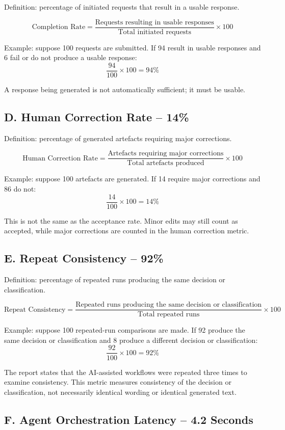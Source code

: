 \documentclass[11pt,a4paper]{article}
\begin{document}
Definition: percentage of initiated requests that result in a usable response.

\[
\text{Completion Rate} =
\frac{\text{Requests resulting in usable responses}}
     {\text{Total initiated requests}}\times 100
\]

Example: suppose 100 requests are submitted. If 94 result in usable responses and 6 fail or do not produce a usable response:
\[
\frac{94}{100}\times 100=94\%
\]

A response being generated is not automatically sufficient; it must be usable.

\subsection{D. Human Correction Rate -- 14\%}

Definition: percentage of generated artefacts requiring major corrections.

\[
\text{Human Correction Rate} =
\frac{\text{Artefacts requiring major corrections}}
     {\text{Total artefacts produced}}\times 100
\]

Example: suppose 100 artefacts are generated. If 14 require major corrections and 86 do not:
\[
\frac{14}{100}\times 100=14\%
\]

This is not the same as the acceptance rate. Minor edits may still count as accepted, while major corrections are counted in the human correction metric.

\subsection{E. Repeat Consistency -- 92\%}

Definition: percentage of repeated runs producing the same decision or classification.

\[
\text{Repeat Consistency} =
\frac{\text{Repeated runs producing the same decision or classification}}
     {\text{Total repeated runs}}\times 100
\]

Example: suppose 100 repeated-run comparisons are made. If 92 produce the same decision or classification and 8 produce a different decision or classification:
\[
\frac{92}{100}\times 100=92\%
\]

The report states that the AI-assisted workflows were repeated three times to examine consistency. This metric measures consistency of the decision or classification, not necessarily identical wording or identical generated text.

\subsection{F. Agent Orchestration Latency -- 4.2 Seconds}
\end{document}
